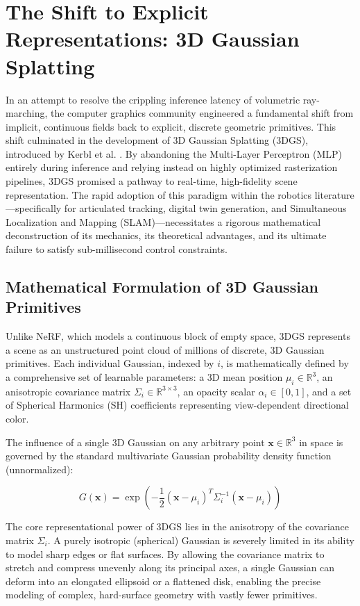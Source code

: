 \documentclass[12pt,a4paper,oneside]{report}
\begin{document}
\section{The Shift to Explicit Representations: 3D Gaussian Splatting}

In an attempt to resolve the crippling inference latency of volumetric ray-marching, the computer graphics community engineered a fundamental shift from implicit, continuous fields back to explicit, discrete geometric primitives. This shift culminated in the development of 3D Gaussian Splatting (3DGS), introduced by Kerbl et al. \cite{kerbl20233d}. By abandoning the Multi-Layer Perceptron (MLP) entirely during inference and relying instead on highly optimized rasterization pipelines, 3DGS promised a pathway to real-time, high-fidelity scene representation. The rapid adoption of this paradigm within the robotics literature—specifically for articulated tracking, digital twin generation, and Simultaneous Localization and Mapping (SLAM)—necessitates a rigorous mathematical deconstruction of its mechanics, its theoretical advantages, and its ultimate failure to satisfy sub-millisecond control constraints.

\subsection{Mathematical Formulation of 3D Gaussian Primitives}

Unlike NeRF, which models a continuous block of empty space, 3DGS represents a scene as an unstructured point cloud of millions of discrete, 3D Gaussian primitives. Each individual Gaussian, indexed by $i$, is mathematically defined by a comprehensive set of learnable parameters: a 3D mean position $\mu_i \in \mathbb{R}^3$, an anisotropic covariance matrix $\Sigma_i \in \mathbb{R}^{3 \times 3}$, an opacity scalar $\alpha_i \in [0, 1]$, and a set of Spherical Harmonics (SH) coefficients representing view-dependent directional color.

The influence of a single 3D Gaussian on any arbitrary point $\mathbf{x} \in \mathbb{R}^3$ in space is governed by the standard multivariate Gaussian probability density function (unnormalized):

\begin{equation}
G(\mathbf{x}) = \exp \left( -\frac{1}{2} (\mathbf{x} - \mu_i)^T \Sigma_i^{-1} (\mathbf{x} - \mu_i) \right)
\end{equation}

The core representational power of 3DGS lies in the anisotropy of the covariance matrix $\Sigma_i$. A purely isotropic (spherical) Gaussian is severely limited in its ability to model sharp edges or flat surfaces. By allowing the covariance matrix to stretch and compress unevenly along its principal axes, a single Gaussian can deform into an elongated ellipsoid or a flattened disk, enabling the precise modeling of complex, hard-surface geometry with vastly fewer primitives.
\end{document}

